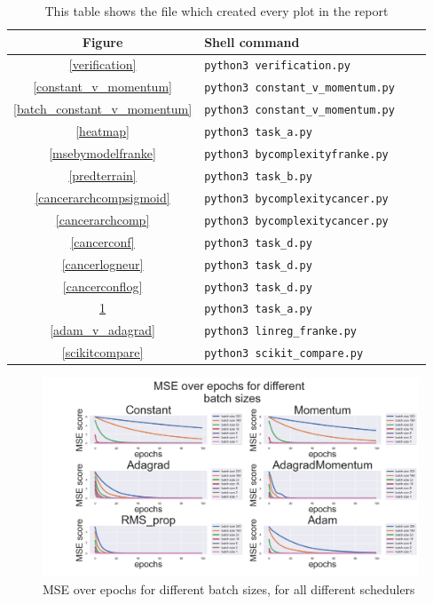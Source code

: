 \documentclass[onecolumn,10pt,cleanfoot]{asme2ej}
\begin{document}
\begin{table}[h]
\caption{This table shows the file which created every plot in the report}
\begin{center}
\label{allparamstable}
\begin{tabular}{c | l l l}
Figure & Shell command \\
\hline
\ref{verification} & \texttt{python3 verification.py}\\
\ref{constant_v_momentum} & \texttt{python3 constant\_v\_momentum.py}\\
\ref{batch_constant_v_momentum} & \texttt{python3 constant\_v\_momentum.py}\\
\ref{heatmap} & \texttt{python3 task\_a.py}\\
\ref{msebymodelfranke} & \texttt{python3 bycomplexityfranke.py}\\
\ref{predterrain} & \texttt{python3 task\_b.py}\\
\ref{cancerarchcompsigmoid} & \texttt{python3 bycomplexitycancer.py}\\
\ref{cancerarchcomp} & \texttt{python3 bycomplexitycancer.py}\\
\ref{cancerconf} & \texttt{python3 task\_d.py}\\
\ref{cancerlogneur} & \texttt{python3 task\_d.py}\\
\ref{cancerconflog} & \texttt{python3 task\_d.py}\\
\ref{sgdbatch} & \texttt{python3 task\_a.py}\\
\ref{adam_v_adagrad} & \texttt{python3 linreg\_franke.py}\\
\ref{scikitcompare} & \texttt{python3 scikit\_compare.py}\\
\hline
\end{tabular}
\end{center}
\end{table}

\begin{figure}[H]
\centerline{\includegraphics[width=7in]{figure/fin_sgd_batch_size_all.png}}
\caption{MSE over epochs for different batch sizes, for all different schedulers}
\label{sgdbatch}
\end{figure}
\end{document}
